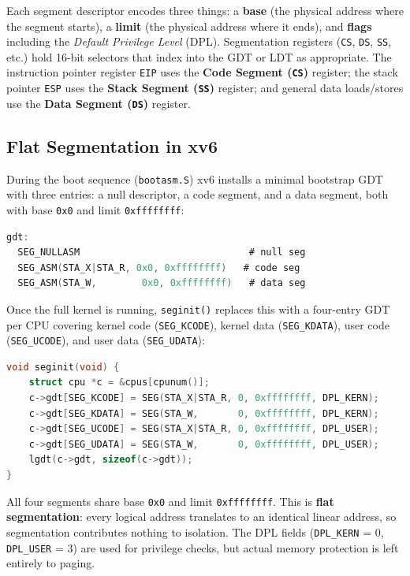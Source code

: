 \documentclass[11pt]{article}
\begin{document}
Each segment descriptor encodes three things: a \textbf{base} (the physical address where the segment starts), a \textbf{limit} (the physical address where it ends), and \textbf{flags} including the \emph{Default Privilege Level} (DPL). Segmentation registers (\texttt{CS}, \texttt{DS}, \texttt{SS}, etc.) hold 16-bit selectors that index into the GDT or LDT as appropriate. The instruction pointer register \texttt{EIP} uses the \textbf{Code Segment (\texttt{CS})} register; the stack pointer \texttt{ESP} uses the \textbf{Stack Segment (\texttt{SS})} register; and general data loads/stores use the \textbf{Data Segment (\texttt{DS})} register.

\subsection{Flat Segmentation in xv6}

During the boot sequence (\texttt{bootasm.S}) xv6 installs a minimal bootstrap GDT with three entries: a null descriptor, a code segment, and a data segment, both with base \texttt{0x0} and limit \texttt{0xffffffff}:

\begin{lstlisting}[language=C, caption={Bootstrap GDT in bootasm.S}]
gdt:
  SEG_NULLASM                              # null seg
  SEG_ASM(STA_X|STA_R, 0x0, 0xffffffff)   # code seg
  SEG_ASM(STA_W,        0x0, 0xffffffff)   # data seg
\end{lstlisting}

Once the full kernel is running, \texttt{seginit()} replaces this with a four-entry GDT per CPU covering kernel code (\texttt{SEG\_KCODE}), kernel data (\texttt{SEG\_KDATA}), user code (\texttt{SEG\_UCODE}), and user data (\texttt{SEG\_UDATA}):

\begin{lstlisting}[language=C, caption={seginit() in vm.c}]
void seginit(void) {
    struct cpu *c = &cpus[cpunum()];
    c->gdt[SEG_KCODE] = SEG(STA_X|STA_R, 0, 0xffffffff, DPL_KERN);
    c->gdt[SEG_KDATA] = SEG(STA_W,       0, 0xffffffff, DPL_KERN);
    c->gdt[SEG_UCODE] = SEG(STA_X|STA_R, 0, 0xffffffff, DPL_USER);
    c->gdt[SEG_UDATA] = SEG(STA_W,       0, 0xffffffff, DPL_USER);
    lgdt(c->gdt, sizeof(c->gdt));
}
\end{lstlisting}

All four segments share base \texttt{0x0} and limit \texttt{0xffffffff}. This is \textbf{flat segmentation}: every logical address translates to an identical linear address, so segmentation contributes nothing to isolation. The DPL fields (\texttt{DPL\_KERN} = 0, \texttt{DPL\_USER} = 3) are used for privilege checks, but actual memory protection is left entirely to paging.
\end{document}

